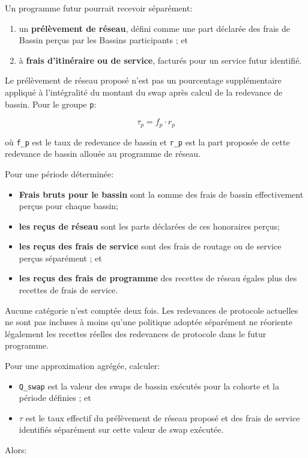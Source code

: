 \documentclass[11pt]{article}
\begin{document}
Un programme futur pourrait recevoir séparément:

\begin{enumerate}[leftmargin=*]
\item un \textbf{prélèvement de réseau}, défini comme une part déclarée des frais de Bassin perçus par les Bassins participants ; et
\item à \textbf{frais d'itinéraire ou de service}, facturés pour un service futur identifié.
\end{enumerate}
Le prélèvement de réseau proposé n'est pas un pourcentage supplémentaire appliqué à l'intégralité du montant du swap après calcul de la redevance de bassin. Pour le groupe \texttt{p}:

\[
\tau_p = f_p \cdot r_p
\]

où \texttt{f\_p} est le taux de redevance de bassin et \texttt{r\_p} est la part proposée de cette redevance de bassin allouée au programme de réseau.

Pour une période déterminée:

\begin{itemize}[leftmargin=*]
\item \textbf{Frais bruts pour le bassin} sont la somme des frais de bassin effectivement perçus pour chaque bassin;
\item \textbf{les reçus de réseau} sont les parts déclarées de ces honoraires perçus;
\item \textbf{les reçus des frais de service} sont des frais de routage ou de service perçus séparément ; et
\item \textbf{les reçus des frais de programme} des recettes de réseau égales plus des recettes de frais de service.
\end{itemize}
Aucune catégorie n'est comptée deux fois. Les redevances de protocole actuelles ne sont pas incluses à moins qu'une politique adoptée séparément ne réoriente légalement les recettes réelles des redevances de protocole dans le futur programme.

Pour une approximation agrégée, calculer:

\begin{itemize}[leftmargin=*]
\item \texttt{Q\_swap} est la valeur des swaps de bassin exécutés pour la cohorte et la période définies ; et
\item \texttt{$\tau$} est le taux effectif du prélèvement de réseau proposé et des frais de service identifiés séparément sur cette valeur de swap exécutée.
\end{itemize}
Alors:
\end{document}
